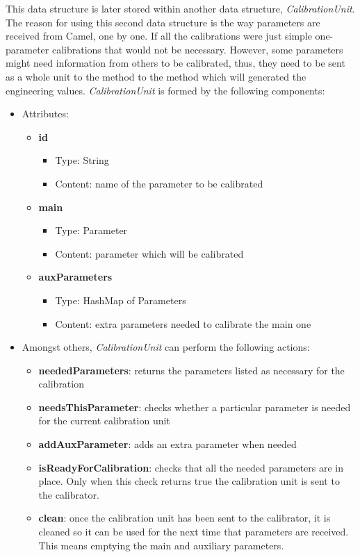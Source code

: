This data structure is later stored within another data structure, \emph{CalibrationUnit}. The reason for using this second data structure is the way parameters are received from Camel, one by one. If all the calibrations were just simple one-parameter calibrations that would not be necessary. However, some parameters might need information from others to be calibrated, thus, they need to be sent as a whole unit to the method to the method which will generated the engineering values. \emph{CalibrationUnit} is formed by the following components:

\begin{itemize}
\item Attributes:
	\begin{itemize}
		\item \textbf{id}
			\begin{itemize}
				\item Type: String
				\item Content: name of the parameter to be calibrated
			\end{itemize}
		\item \textbf{main}
			\begin{itemize}
				\item Type: Parameter
				\item Content: parameter which will be calibrated
			\end{itemize}				
		\item \textbf{auxParameters}
			\begin{itemize}
				\item Type: HashMap of Parameters
				\item Content: extra parameters needed to calibrate the main one
			\end{itemize}												
		
	\end{itemize}
	
	\item Amongst others, \emph{CalibrationUnit} can perform the following actions:
	\begin{itemize}
		\item \textbf{neededParameters}: returns the parameters listed as necessary for the calibration
		\item \textbf{needsThisParameter}: checks whether a particular parameter is needed for the current calibration unit
		\item \textbf{addAuxParameter}: adds an extra parameter when needed
		\item \textbf{isReadyForCalibration}: checks that all the needed parameters are in place. Only when this check returns true the calibration unit is sent to the calibrator.
		\item \textbf{clean}: once the calibration unit has been sent to the calibrator, it is cleaned so it can be used for the next time that parameters are received. This means emptying the main and auxiliary parameters.
	\end{itemize}

\end{itemize}


